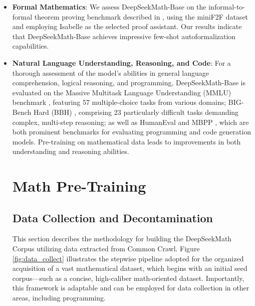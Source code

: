 \begin{itemize}[topsep=0pt]
\begin{itemize}[topsep=0pt]
DeepSeekMath-Base demonstrates strong performance on English evaluation benchmarks, rivaling the proprietary Minerva 540B model \citep{minerva}, and outperforming all publicly available base models—including Mistral 7B \citep{mistral} and Llemma-34B \citep{llemma}—by substantial margins, regardless of prior math-specific pre-training. Furthermore, DeepSeekMath-Base achieves particularly impressive results on Chinese benchmarks. This can likely be attributed to our approach of incorporating high-quality math data from multiple languages, in contrast to prior studies \citep{minerva,llemma} which utilized exclusively English datasets. Following further mathematical instruction tuning and reinforcement learning, the derived models, DeepSeekMath-Instruct and DeepSeekMath-RL, attain robust performance, surpassing 50\% accuracy on the highly challenging, competition-grade MATH dataset—marking the first occurrence of such a milestone among open-source models.

\item \textbf{Formal Mathematics}: We assess DeepSeekMath-Base on the informal-to-formal theorem proving benchmark described in \citep{dsp_proof}, using the miniF2F dataset \citep{minif2f} and employing Isabelle \citep{isabelle} as the selected proof assistant. Our results indicate that DeepSeekMath-Base achieves impressive few-shot autoformalization capabilities.
\item \textbf{Natural Language Understanding, Reasoning, and Code}: For a thorough assessment of the model's abilities in general language comprehension, logical reasoning, and programming, DeepSeekMath-Base is evaluated on the Massive Multitask Language Understanding (MMLU) benchmark \citep{mmlu}, featuring 57 multiple-choice tasks from various domains; BIG-Bench Hard (BBH) \citep{bbh}, comprising 23 particularly difficult tasks demanding complex, multi-step reasoning; as well as HumanEval \citep{codex} and MBPP \citep{mbpp}, which are both prominent benchmarks for evaluating programming and code generation models. Pre-training on mathematical data leads to improvements in both understanding and reasoning abilities.

\section{Math Pre-Training}

\subsection{Data Collection and Decontamination} This section describes the methodology for building the DeepSeekMath Corpus utilizing data extracted from Common Crawl. Figure \ref{fig:data_collect} illustrates the stepwise pipeline adopted for the organized acquisition of a vast mathematical dataset, which begins with an initial seed corpus—such as a concise, high-caliber math-oriented dataset. Importantly, this framework is adaptable and can be employed for data collection in other areas, including programming.


\end{itemize}
\end{itemize}

